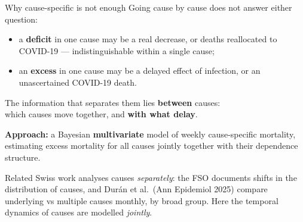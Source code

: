 \documentclass[aspectratio=169,10pt]{beamer}
\newcommand{\compresslist}{%
  \setlength{\itemsep}{3pt}%
  \setlength{\parskip}{0pt}%
  \setlength{\parsep}{0pt}%
}
\newcommand{\punch}[1]{{\color{headerfontcol}\bfseries #1}}
\begin{document}
\begin{frame}{Why cause-specific is not enough}
  Going cause by cause does not answer either question:
  \begin{itemize}\compresslist
    \item a \textbf{deficit} in one cause may be a real decrease, or deaths
          reallocated to COVID-19 --- indistinguishable within a single cause;
    \item an \textbf{excess} in one cause may be a delayed effect of infection,
          or an unascertained COVID-19 death.
  \end{itemize}
  \vfill
  \begin{center}
    The information that separates them lies \punch{between} causes:\\
    which causes move together, and \punch{with what delay}.
  \end{center}
  \vfill
  \textbf{Approach:} a Bayesian \textbf{multivariate} model of weekly
  cause-specific mortality, estimating excess mortality for all causes jointly
  together with their dependence structure.
  \vspace{0.3em}

  {\scriptsize\color{bordercol} Related Swiss work analyses causes
  \emph{separately}: the FSO documents shifts in the distribution of causes, and
  Dur\'an et al.\ (Ann Epidemiol 2025) compare underlying vs multiple causes
  monthly, by broad group. Here the temporal dynamics of causes are modelled
  \emph{jointly}.}
\end{frame}
\end{document}
